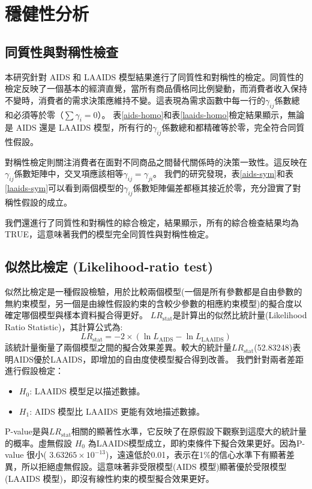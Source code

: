 
\section{穩健性分析}

\subsection{同質性與對稱性檢查}

本研究針對 AIDS 和 LAAIDS 模型結果進行了同質性和對稱性的檢定。同質性的檢定反映了一個基本的經濟直覺，當所有商品價格同比例變動，而消費者收入保持不變時，消費者的需求決策應維持不變。這表現為需求函數中每一行的\(\gamma_{ij}\)係數總和必須等於零（\(\sum \gamma_i = 0\)）。
表\ref{aids-homo}和表\ref{laaids-homo}檢定結果顯示，無論是 AIDS 還是 LAAIDS 模型，所有行的\(\gamma_{ij}\)係數總和都精確等於零，完全符合同質性假設。

對稱性檢定則關注消費者在面對不同商品之間替代關係時的決策一致性。這反映在\(\gamma_{ij}\)係數矩陣中，交叉項應該相等\(\gamma_{ij} = \gamma_{ji}\)。
我們的研究發現，表\ref{aids-sym}和表\ref{laaids-sym}可以看到兩個模型的\(\gamma_{ij}\)係數矩陣偏差都極其接近於零，充分證實了對稱性假設的成立。

我們還進行了同質性和對稱性的綜合檢定，結果顯示，所有的綜合檢查結果均為TRUE，這意味著我們的模型完全同質性與對稱性檢定。

\subsection{似然比檢定 (Likelihood-ratio test)}

似然比檢定是一種假設檢驗，用於比較兩個模型(一個是所有參數都是自由參數的無約束模型，另一個是由線性假設約束的含較少參數的相應約束模型)的擬合度以確定哪個模型與樣本資料擬合得更好。
\( LR_{\text{stat}} \)是計算出的似然比統計量(Likelihood Ratio Statistic)，其計算公式為: 
\[LR_{\text{stat}} = -2 \times (\ln L_{\text{AIDS}} - \ln L_{\text{LAAIDS}})\]
該統計量衡量了兩個模型之間的擬合效果差異。較大的統計量\( LR_{\text{stat}} \)(52.83248)表明AIDS優於LAAIDS，即增加的自由度使模型擬合得到改善。
我們針對兩者差距進行假設檢定：

\begin{itemize}
    \item \(H_0\): LAAIDS 模型足以描述數據。
    \item \(H_1\): AIDS 模型比 LAAIDS 更能有效地描述數據。
\end{itemize}
\noindent P-value是與\( LR_{\text{stat}} \)相關的顯著性水準，它反映了在原假設下觀察到這麼大的統計量的概率。虛無假設 \( H_0 \) 為LAAIDS模型成立，即約束條件下擬合效果更好。因為P-value 很小( \( 3.63265 \times 10^{-13} \))，遠遠低於0.01，表示在1\%的信心水準下有顯著差異，所以拒絕虛無假設。這意味著非受限模型(AIDS 模型)顯著優於受限模型(LAAIDS 模型)，即沒有線性約束的模型擬合效果更好。
